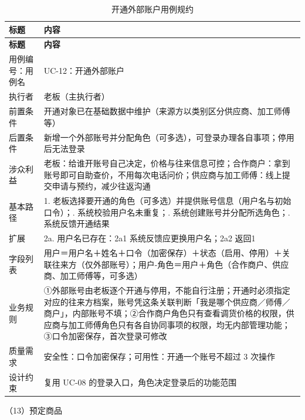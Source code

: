 {\small
\begin{longtable}{@{}L{3.0cm} L{12.3cm}@{}}
\caption{开通外部账户用例规约}\label{tab:uc-12}\\
\toprule
\textbf{标题} & \textbf{内容} \\
\midrule
\endfirsthead
\toprule
\textbf{标题} & \textbf{内容} \\
\midrule
\endhead
用例编号：用例名 & UC-12：开通外部账户 \\
\midrule
执行者 & 老板（主执行者） \\
\midrule
前置条件 & 开通对象已在基础数据中维护（来源方以类别区分供应商、加工师傅等） \\
\midrule
后置条件 & 新增一个外部账号并分配角色（可多选），可登录办理各自事项；停用后无法登录 \\
\midrule
涉众利益 & 老板：给谁开账号自己决定，价格与往来信息可控；\newline 合作商户：拿到账号即可自助查价，不用每次电话问价；\newline 供应商与加工师傅：线上提交申请与预约，减少往返沟通 \\
\midrule
基本路径 & 1. 老板选择要开通的角色（可多选）并提供账号信息（用户名与初始口令）；. 系统校验用户名未重复；. 系统创建账号并分配所选角色；. 系统反馈开通结果 \\
\midrule
扩展 & 2a. 用户名已存在：2a1 系统反馈应更换用户名；2a2 返回1 \\
\midrule
字段列表 & 用户＝用户名＋姓名＋口令（加密保存）＋状态（启用、停用）＋关联往来方（仅外部账号）；\newline 用户-角色＝用户＋角色（合作商户、供应商、加工师傅等，可多选） \\
\midrule
业务规则 & ①外部账号由老板逐个开通与停用，不能自行注册；开通时必须指定对应的往来方档案，账号凭这条关联判断「我是哪个供应商／师傅／商户」，内部账号不填；\newline ②合作商户角色只有查看调货价格的权限，供应商与加工师傅角色只有各自协同事项的权限，均无内部管理功能；\newline ③口令加密保存，首次登录可修改 \\
\midrule
质量需求 & 安全性：口令加密保存；\newline 可用性：开通一个账号不超过 3 次操作 \\
\midrule
设计约束 & 复用 UC-08 的登录入口，角色决定登录后的功能范围 \\
\midrule
\bottomrule
\end{longtable}}
\noindent（13）预定商品

